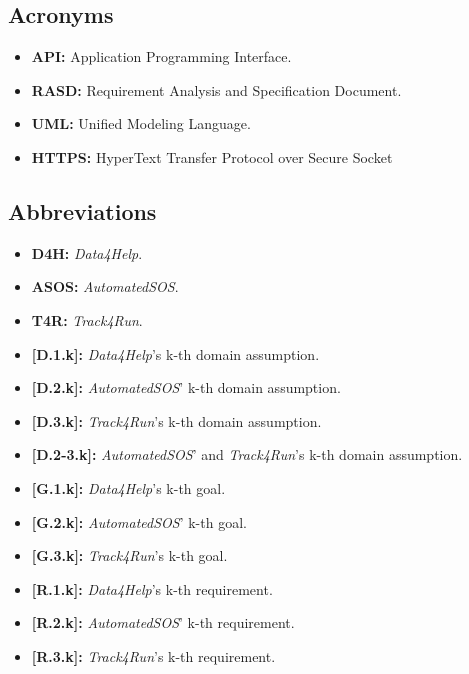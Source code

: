     \subsection{Acronyms}
        \begin{itemize}
            \item \textbf{API:} Application Programming Interface.
        
            \item \textbf{RASD:} Requirement Analysis and Specification Document.
            
            \item \textbf{UML:} Unified Modeling Language.
            
            \item \textbf{HTTPS:} HyperText Transfer Protocol over Secure Socket 
        \end{itemize}
        
    \subsection{Abbreviations}
        \begin{itemize}
            \item \textbf{D4H:} \emph{Data4Help}.
            
            \item \textbf{ASOS:} \emph{AutomatedSOS}.
            
            \item \textbf{T4R:} \emph{Track4Run}.
            
            \item \textbf{[D.1.k]:} \emph{Data4Help}'s k-th domain assumption.
            
            \item \textbf{[D.2.k]:} \emph{AutomatedSOS}' k-th domain assumption.
            
            \item \textbf{[D.3.k]:} \emph{Track4Run}'s k-th domain assumption.
            
            \item  \textbf{[D.2-3.k]:} \emph{AutomatedSOS}' and \emph{Track4Run}'s k-th domain assumption.
            
            \item \textbf{[G.1.k]:} \emph{Data4Help}'s k-th goal.
            
            \item \textbf{[G.2.k]:} \emph{AutomatedSOS}' k-th goal.
            
            \item \textbf{[G.3.k]:} \emph{Track4Run}'s k-th goal.
            
            \item \textbf{[R.1.k]:} \emph{Data4Help}'s k-th requirement.
            
            \item \textbf{[R.2.k]:} \emph{AutomatedSOS}' k-th requirement.
            
            \item \textbf{[R.3.k]:} \emph{Track4Run}'s k-th requirement.
        \end{itemize}
